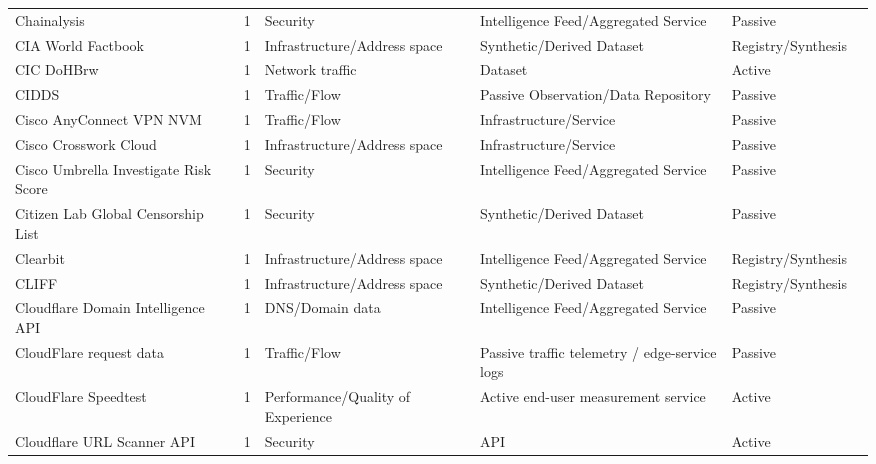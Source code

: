 \begin{table}[h!]
\begin{tabular}{lllllll}
Chainalysis & \cite{chainalysis} & 1 & Security & Intelligence Feed/Aggregated Service & Passive & \cite{10.1145/3646547.3689005} \\
CIA World Factbook & \cite{cia-world-factbook} & 1 & Infrastructure/Address space & Synthetic/Derived Dataset & Registry/Synthesis & \cite{10.1007/978-3-031-56252-5_11} \\
CIC DoHBrw & \cite{9251211} & 1 & Network traffic & Dataset & Active & \cite{10.1145/3777912.3839833} \\
CIDDS & \cite{cidds-dataset} & 1 & Traffic/Flow & Passive Observation/Data Repository & Passive & \cite{10.1145/3646547.3689011} \\
Cisco AnyConnect VPN NVM & \cite{cisco-nvm} & 1 & Traffic/Flow & Infrastructure/Service & Passive & \cite{10.1007/978-3-030-72582-2_31} \\
Cisco Crosswork Cloud & \cite{cisco-crosswork} & 1 & Infrastructure/Address space & Infrastructure/Service & Passive & \cite{10.1007/978-3-031-85960-1_14} \\
Cisco Umbrella Investigate Risk Score & \cite{cisco-umbrella} & 1 & Security & Intelligence Feed/Aggregated Service & Passive & \cite{10.1007/978-3-030-72582-2_31} \\
Citizen Lab Global Censorship List & \cite{citizen-lab} & 1 & Security & Synthetic/Derived Dataset & Passive & \cite{10.1007/978-3-031-56249-5_5} \\
Clearbit & \cite{clearbit} & 1 & Infrastructure/Address space & Intelligence Feed/Aggregated Service & Registry/Synthesis & \cite{10.1145/3487552.3487853} \\
CLIFF & \cite{cliff} & 1 & Infrastructure/Address space & Synthetic/Derived Dataset & Registry/Synthesis & \cite{10.1145/3618257.3624816} \\
Cloudflare Domain Intelligence API & \cite{cloudflare-domain-intelligence} & 1 & DNS/Domain data & Intelligence Feed/Aggregated Service & Passive & \cite{10.1145/3517745.3561418} \\
CloudFlare request data & \cite{cloudflare-request-data} & 1 & Traffic/Flow & Passive traffic telemetry / edge-service logs & Passive & \cite{10.1145/3517745.3561444} \\
CloudFlare Speedtest & \cite{cloudflare-speedtest} & 1 & Performance/Quality of Experience & Active end-user measurement service & Active & \cite{10.1007/978-3-030-98785-5_4} \\
Cloudflare URL Scanner API & \cite{urlscanner} & 1 & Security & API & Active & \cite{10.1145/3777912.3839788} \\

\end{tabular}
\end{table}
